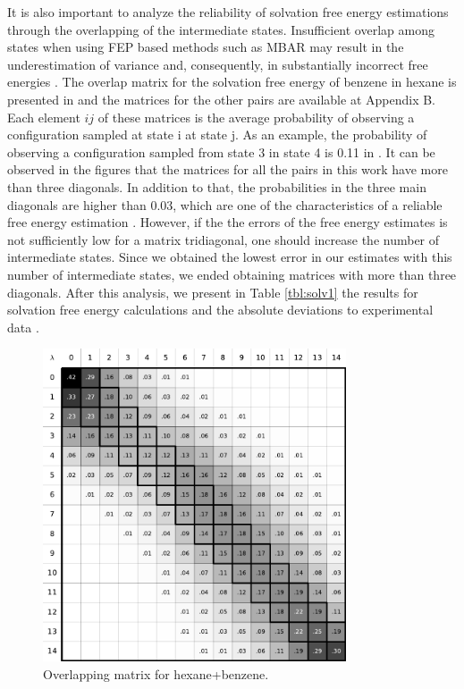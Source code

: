 \FloatBarrier
It is also important to analyze the reliability of solvation free energy estimations  through the overlapping of the intermediate states. Insufficient overlap among states when using FEP based methods such as MBAR may result in the underestimation of variance and, consequently, in substantially incorrect free energies \cite{klimovich}. The overlap matrix for the solvation free energy of benzene in hexane is presented in  and the matrices for the other pairs are available at Appendix B. Each element $ij$ of these matrices is the average probability of observing a configuration sampled at state  i at state j. As an example, the probability of observing a configuration sampled from state 3 in state 4 is 0.11 in . It can be observed in the figures that  the matrices for all the pairs in this work have more than  three diagonals. In addition to that,  the probabilities in the three main diagonals are higher than 0.03, which are one of the characteristics of a reliable free energy estimation \cite{klimovich}. However, if the the errors of the free energy estimates is not sufficiently low for a matrix tridiagonal, one should increase the number of intermediate states. Since we obtained the lowest error in our estimates with this number of intermediate states, we ended obtaining matrices with more than three diagonals. After this analysis, we present in Table \ref{tbl:solv1} the results for solvation free energy calculations and the absolute deviations to experimental data \cite{doi:10.1021/ci034120c}.   

\FloatBarrier
\begin{figure}[h]
    \centering
    \includegraphics[width=0.8\textwidth]{Figures/ohex_benz}
    \caption{Overlapping matrix for hexane+benzene.}
    \label{fig:hexove}
\end{figure}

